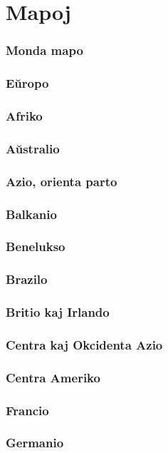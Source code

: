 \part{Mapoj}

\section{Monda mapo}
\newpage
\section{Eŭropo}
\newpage
\section{Afriko}
\newpage
\section{Aŭstralio}
\newpage
\section{Azio, orienta parto}
\newpage
\section{Balkanio}
\newpage
\section{Benelukso}
\newpage
\section{Brazilo}
\newpage
\section{Britio kaj Irlando}
\newpage
\section{Centra kaj Okcidenta Azio}
\newpage
\section{Centra Ameriko}
\newpage
\section{Francio}
\newpage
\section{Germanio}
\newpage
